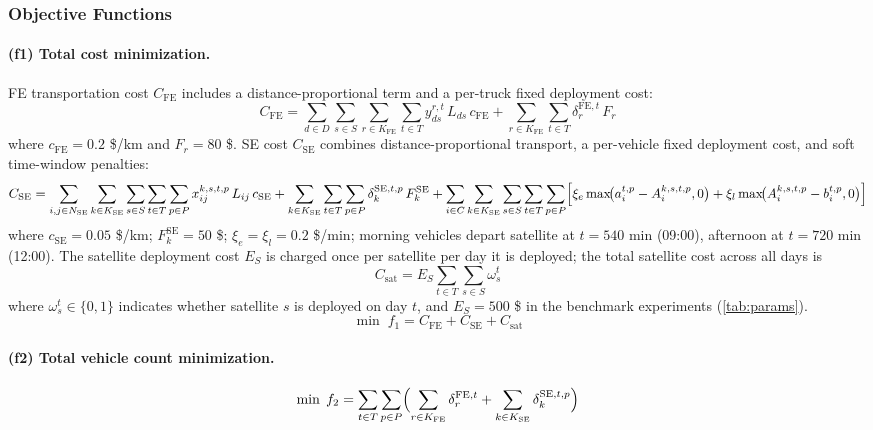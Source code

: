 \documentclass[11pt, a4paper]{article}
\newcommand{\KFE}{K_{\mathrm{FE}}}
\newcommand{\KSE}{K_{\mathrm{SE}}}
\newcommand{\NSE}{N_{\mathrm{SE}}}
\newcommand{\cFE}{c_{\mathrm{FE}}}
\newcommand{\cSE}{c_{\mathrm{SE}}}
\newcommand{\CFE}{C_{\mathrm{FE}}}
\newcommand{\CSE}{C_{\mathrm{SE}}}
\newcommand{\CSat}{C_{\mathrm{sat}}}
\numberwithin{equation}{section}
\begin{document}
\subsubsection{Objective Functions}

\paragraph{(f1) Total cost minimization.}
FE transportation cost $\CFE$ includes a distance-proportional term and a
per-truck fixed deployment cost:
\begin{equation}
  \CFE = \sum_{d\in D}\sum_{s\in S}\sum_{r\in\KFE}\sum_{t\in T}
           y_{ds}^{r,t}\,L_{ds}\,\cFE
         + \sum_{r\in\KFE}\sum_{t\in T}\delta_r^{\mathrm{FE},t}\,F_r
  \label{eq:CFE}
\end{equation}
where $\cFE = 0.2$ \$/km and $F_r = 80$ \$.  SE cost $\CSE$ combines
distance-proportional transport, a per-vehicle fixed deployment cost, and
soft time-window penalties:
\begin{equation}
  \CSE = \sum_{i,j\in\NSE}\sum_{k\in\KSE}\sum_{s\in S}\sum_{t\in T}\sum_{p\in P}
           x_{ij}^{k,s,t,p}\,L_{ij}\,\cSE
         + \sum_{k\in\KSE}\sum_{t\in T}\sum_{p\in P}\delta_k^{\mathrm{SE},t,p}\,F_k^{\mathrm{SE}}
         + \sum_{i\in C}\sum_{k\in\KSE}\sum_{s\in S}\sum_{t\in T}\sum_{p\in P}
           \Bigl[\xi_e\max\!\bigl(a_i^{t,p}-A_i^{k,s,t,p},0\bigr)
                +\xi_l\max\!\bigl(A_i^{k,s,t,p}-b_i^{t,p},0\bigr)\Bigr]
  \label{eq:CSE}
\end{equation}
where $\cSE=0.05$ \$/km; $F_k^{\mathrm{SE}}=50$ \$; $\xi_e=\xi_l=0.2$ \$/min;
morning vehicles depart satellite at $t=540$ min (09:00), afternoon at $t=720$ min (12:00).
The satellite deployment cost $E_S$ is charged once per satellite per day
it is deployed; the total satellite cost across all days is
\begin{equation}
  \CSat = E_S \sum_{t\in T}\sum_{s\in S} \omega_s^t
  \label{eq:CSat}
\end{equation}
where $\omega_s^t\in\{0,1\}$ indicates whether satellite $s$ is deployed on day $t$, and
$E_S = 500$ \$ in the benchmark experiments (\cref{tab:params}).
\begin{equation}
  \min\;f_1 = \CFE + \CSE + \CSat
  \label{eq:f1}
\end{equation}

\paragraph{(f2) Total vehicle count minimization.}
\begin{equation}
  \min\;f_2 = \sum_{t\in T}\sum_{p\in P}
    \Bigl(\sum_{r\in\KFE}\delta_r^{\mathrm{FE},t}
         +\sum_{k\in\KSE}\delta_k^{\mathrm{SE},t,p}\Bigr)
  \label{eq:f2}
\end{equation}
\end{document}
